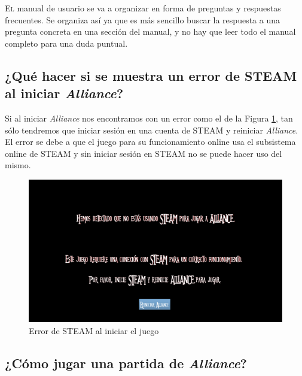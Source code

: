 \lettrine[lines=2,findent=2pt,nindent=3pt,loversize=0.1]{\textcolor[gray]{0.4}{E}}{l} manual de usuario se va a organizar en forma de preguntas y respuestas frecuentes. Se organiza así ya que es más sencillo buscar la respuesta a una pregunta concreta en una sección del manual, y no hay que leer todo el manual completo para una duda puntual.

\subsection{¿Qué hacer si se muestra un error de STEAM al iniciar \textit{Alliance}?}

Si al iniciar \textit{Alliance} nos encontramos con un error como el de la Figura \ref{ErrorSteam}, tan sólo tendremos que iniciar sesión en una cuenta de STEAM y reiniciar \textit{Alliance}. El error se debe a que el juego para su funcionamiento online usa el subsistema online de STEAM y sin iniciar sesión en STEAM no se puede hacer uso del mismo.

\begin{figure}[H]
  \centering
  \includegraphics[width=12cm]{./images/ErrorSteam.png}
  \caption{Error de STEAM al iniciar el juego}
  \label{ErrorSteam}
\end{figure}


\subsection{¿Cómo jugar una partida de \textit{Alliance}?}

